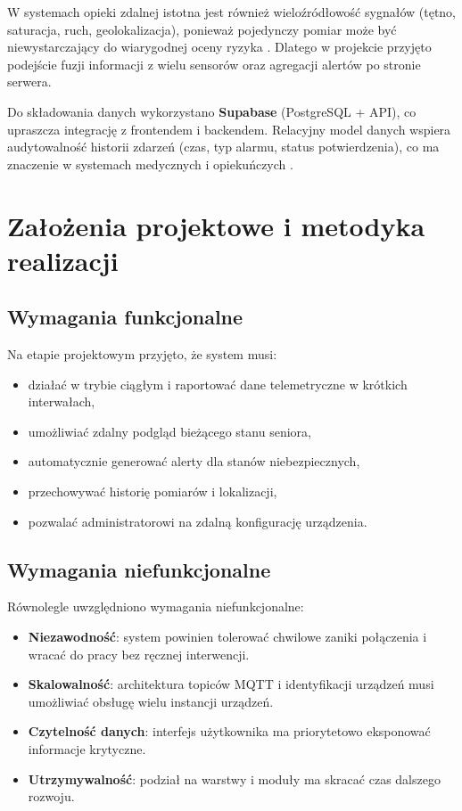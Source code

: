 \documentclass[a4paper,12pt]{article}
\begin{document}
W systemach opieki zdalnej istotna jest również wieloźródłowość sygnałów (tętno, saturacja, ruch, geolokalizacja), ponieważ pojedynczy pomiar może być niewystarczający do wiarygodnej oceny ryzyka \cite{giggins2013wearable}. Dlatego w projekcie przyjęto podejście fuzji informacji z wielu sensorów oraz agregacji alertów po stronie serwera.

Do składowania danych wykorzystano \textbf{Supabase} (PostgreSQL + API), co upraszcza integrację z frontendem i backendem. Relacyjny model danych wspiera audytowalność historii zdarzeń (czas, typ alarmu, status potwierdzenia), co ma znaczenie w systemach medycznych i opiekuńczych \cite{postgreSQLdocs}.

\section{Założenia projektowe i metodyka realizacji}
\subsection{Wymagania funkcjonalne}
Na etapie projektowym przyjęto, że system musi:
\begin{itemize}
  \item działać w trybie ciągłym i raportować dane telemetryczne w krótkich interwałach,
  \item umożliwiać zdalny podgląd bieżącego stanu seniora,
  \item automatycznie generować alerty dla stanów niebezpiecznych,
  \item przechowywać historię pomiarów i lokalizacji,
  \item pozwalać administratorowi na zdalną konfigurację urządzenia.
\end{itemize}

\subsection{Wymagania niefunkcjonalne}
Równolegle uwzględniono wymagania niefunkcjonalne:
\begin{itemize}
  \item \textbf{Niezawodność}: system powinien tolerować chwilowe zaniki połączenia i wracać do pracy bez ręcznej interwencji.
  \item \textbf{Skalowalność}: architektura topiców MQTT i identyfikacji urządzeń musi umożliwiać obsługę wielu instancji urządzeń.
  \item \textbf{Czytelność danych}: interfejs użytkownika ma priorytetowo eksponować informacje krytyczne.
  \item \textbf{Utrzymywalność}: podział na warstwy i moduły ma skracać czas dalszego rozwoju.
\end{itemize}
\end{document}

